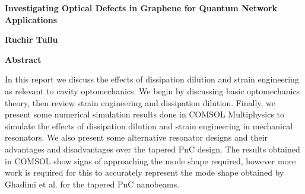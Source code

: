 \thispagestyle{plain}
\begin{center}
    \Large
    \textbf{Investigating Optical Defects in Graphene for Quantum Network Applications}
    
    
    \vspace{0.4cm}
    \large
    \textbf{Ruchir Tullu}
    
    \vspace{0.9cm}
    \textbf{Abstract}
\end{center}
In this report we discuss the effects of dissipation dilution and strain engineering as relevant
to cavity optomechanics. We begin by discussing basic optomechanics theory, then review strain
engineering and dissipation dilution. Finally, we present some numerical simulation results done
in COMSOL Multiphysics to simulate the effects of dissipation dilution and strain engineering
in mechanical resonators. We also present some alternative resonator designs and their advantages and
disadvantages over the tapered PnC design. The results obtained in COMSOL show signs of
approaching the mode shape required, however more work is required for this to accurately represent
the mode shape obtained by Ghadimi et al. for the tapered PnC nanobeams.
